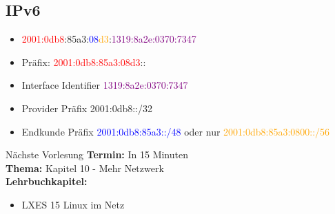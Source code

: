 \documentclass[aspectratio=43]{beamer}
\begin{document}
\subsection{IPv6}
\begin{frame} 
	\begin{block}{} 
	\begin{itemize}
	\item \textcolor{red}{2001:0db8}:\textcolor{green!50!black}{85a3}:\textcolor{blue}{08}\textcolor{orange}{d3}:\textcolor{purple}{1319:8a2e:0370:7347}
	\item Präfix: \textcolor{red}{2001:0db8:85a3:08d3}::
	\item Interface Identifier \textcolor{purple}{1319:8a2e:0370:7347}
	\item Provider Präfix \textcolor{green!50!black}{2001:0db8::/32}
	\item Endkunde Präfix    \textcolor{blue}{2001:0db8:85a3::/48} oder nur \textcolor{orange}{2001:0db8:85a3:0800::/56} 
	\end{itemize}
	\end{block}
\end{frame}


\begin{frame}[plain]
\begin{alertblock}{Nächste Vorlesung}
\textbf{Termin:} In 15 Minuten\\
\textbf{Thema:} Kapitel 10 - Mehr Netzwerk \\
\textbf{Lehrbuchkapitel:} 
\begin{itemize}
\item LXES 15 Linux im Netz 
\end{itemize}
\end{alertblock}
\end{frame}

\materialframe
\end{document}
